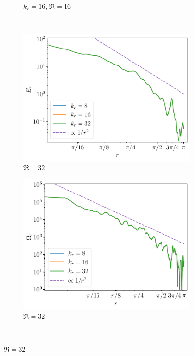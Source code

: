 \documentclass[../main.tex]{subfiles}
\begin{document}
\begin{figure}[!ht]
\begin{subfigure}{0.44\textwidth}
		\caption{$k_r = 16$, $\Re = 16$}
	\end{subfigure}\\
	\begin{subfigure}{0.44\textwidth}
		\centering
		\includegraphics[width=\textwidth]{images/Energy_kdn.test7.059.pdf}
		\caption{$\Re = 32$}
	\end{subfigure}\hspace{0.04\textwidth}
	\begin{subfigure}{0.44\textwidth}
		\centering
		\includegraphics[width=\textwidth]{images/Enstrophy_kdn.test7.059.pdf}
		\caption{$\Re = 32$}
	\end{subfigure}\\

\end{figure}
\end{document}
